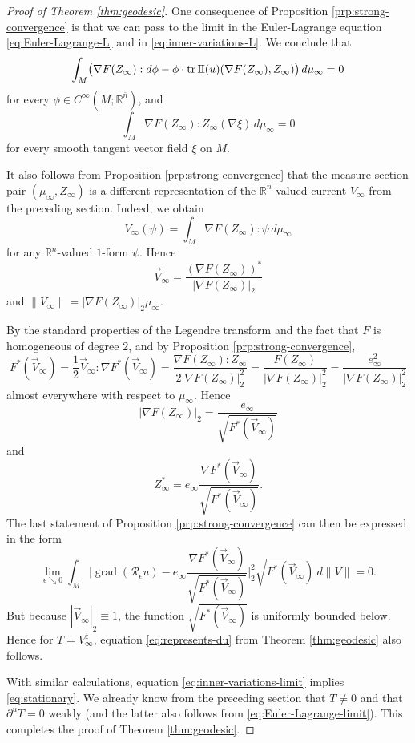 \documentclass[a4paper]{article}
\newcommand{\R}{\mathbb{R}}
\newcommand{\ndim}{{\bar{n}}}
\newcommand{\sff}{\mathrm{I{\mkern -1mu}I}}
\DeclareMathOperator{\tr}{tr}
\DeclareMathOperator{\grad}{grad}
\theoremstyle{definition}
\theoremstyle{remark}
\begin{document}
\begin{proof}[Proof of Theorem \ref{thm:geodesic}]
One consequence of Proposition \ref{prp:strong-convergence} is that we can pass to the limit
in the Euler-Lagrange equation \eqref{eq:Euler-Lagrange-L} and in \eqref{eq:inner-variations-L}. We conclude that
\begin{equation} \label{eq:Euler-Lagrange-limit}
\int_M \bigl(\nabla F(Z_\infty) : d\phi - \phi \cdot \tr \sff(u)(\nabla F(Z_\infty), Z_\infty)\bigr) \, d\mu_\infty = 0
\end{equation}
for every $\phi \in C^\infty(M; \R^\ndim)$, and
\begin{equation} \label{eq:inner-variations-limit}
\int_M \nabla F(Z_\infty) : Z_\infty(\nabla \xi) \, d\mu_\infty = 0
\end{equation}
for every smooth tangent vector field $\xi$ on $M$.

It also follows from Proposition \ref{prp:strong-convergence} that 
the measure-section pair $(\mu_\infty, Z_\infty)$ is a different representation
of the $\R^\ndim$-valued current $V_\infty$ from the preceding section.
Indeed, we obtain
\[
V_\infty(\psi) = \int_M \nabla F(Z_\infty) : \psi \, d\mu_\infty
\]
for any $\R^n$-valued $1$-form $\psi$.
Hence
\[
\vec{V}_\infty= \frac{(\nabla F(Z_\infty))^*}{|\nabla F(Z_\infty)|_2}
\] 
and $\|V_\infty\| = |\nabla F(Z_\infty)|_2 \mu_\infty$.

By the standard properties of the Legendre transform and the fact that $F$ is homogeneous of degree $2$, and by Proposition \ref{prp:strong-convergence},
\[
F^*(\vec{V}_\infty) = \frac{1}{2} \vec{V}_\infty : \nabla F^*(\vec{V}_\infty) = \frac{\nabla F(Z_\infty) : Z_\infty}{2|\nabla F(Z_\infty)|_2^2} = \frac{F(Z_\infty)}{|\nabla F(Z_\infty)|_2^2} = \frac{e_\infty^2}{|\nabla F(Z_\infty)|_2^2}
\]
almost everywhere with respect to $\mu_\infty$. Hence
\[
|\nabla F(Z_\infty)|_2 = \frac{e_\infty}{\sqrt{F^*(\vec{V}_\infty)}}
\]
and
\[
Z_\infty^* = e_\infty \frac{\nabla F^*(\vec{V}_\infty)}{\sqrt{F^*(\vec{V}_\infty)}}.
\]
The last statement of Proposition \ref{prp:strong-convergence} can then be expressed in the form
\[
\lim_{\epsilon \searrow 0} \int_M \biggl|\grad(\mathcal{R}_\epsilon u) - e_\infty \frac{\nabla F^*(\vec{V}_\infty)}{\sqrt{F^*(\vec{V}_\infty)}}\biggr|_2^2 \sqrt{F^*(\vec{V}_\infty)} \, d\|V\| = 0.
\]
But because $|\vec{V}_\infty|_2 \equiv 1$, the function $\sqrt{F^*(\vec{V}_\infty)}$ is uniformly bounded below. Hence for $T = V^\ddagger_\infty$, equation
\eqref{eq:represents-du} from
Theorem \ref{thm:geodesic} also follows.

With similar calculations, equation \eqref{eq:inner-variations-limit} implies \eqref{eq:stationary}. We already know from the preceding section that
$T \neq 0$ and that $\partial^u T = 0$ weakly (and the latter also follows from \eqref{eq:Euler-Lagrange-limit}).
This completes the proof of Theorem \ref{thm:geodesic}.
\end{proof}
\end{document}
